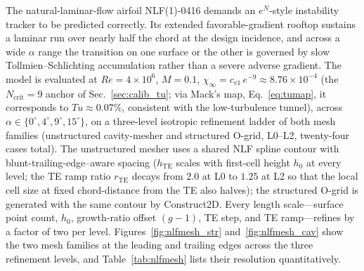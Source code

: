 \documentclass[journal]{new-aiaa}
\begin{document}
The natural-laminar-flow airfoil NLF(1)-0416 demands an $e^N$-style instability
tracker to be predicted correctly. Its extended favorable-gradient rooftop
sustains a laminar run over nearly half the chord at the design incidence, and
across a wide $\alpha$ range the transition on one surface or the other is
governed by slow Tollmien--Schlichting accumulation rather than a severe adverse
gradient. The model is evaluated at $Re\!=\!4\!\times\!10^6$, $M\!=\!0.1$,
$\chi_\infty\!=\!c_{v1}\,e^{-9}\!\approx\!8.76\!\times\!10^{-4}$
(the $N_\mathrm{crit}\!=\!9$ anchor of Sec.~\ref{sec:calib_tu}; via Mack's
map, Eq.~\eqref{eq:tumap}, it corresponds to $Tu\!\approx\!0.07\%$, consistent
with the low-turbulence tunnel), across
$\alpha\!\in\!\{0^\circ, 4^\circ, 9^\circ,
15^\circ\}$, on a three-level isotropic refinement ladder of both mesh families
(unstructured cavity-mesher and structured O-grid, L0--L2, twenty-four
cases total). The unstructured mesher uses a shared NLF spline contour with
blunt-trailing-edge--aware spacing ($h_\mathrm{TE}$ scales with first-cell
height $h_0$ at every level; the TE ramp ratio $r_\mathrm{TE}$ decays from
$2.0$ at L0 to $1.25$ at L2 so that the local cell size at fixed chord-distance
from the TE also halves); the structured O-grid is generated with the same
contour by Construct2D. Every length scale---surface point count, $h_0$,
growth-ratio offset $(g-1)$, TE step, and TE ramp---refines by a factor of two
per level.
Figures~\ref{fig:nlfmesh_str} and~\ref{fig:nlfmesh_cav} show the two mesh
families at the leading and trailing edges across the three refinement levels,
and Table~\ref{tab:nlfmesh} lists their resolution quantitatively.
\end{document}
